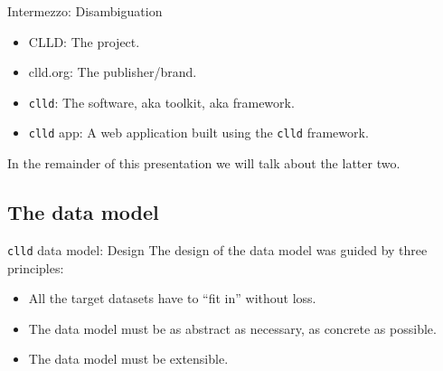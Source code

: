 \documentclass{beamer}
\begin{document}
\begin{frame}{Intermezzo: Disambiguation}
\begin{itemize}
\item {\color{darkred}CLLD}: The project.
\item {\color{darkred}clld.org}: The publisher/brand.
\item {\color{darkred}\texttt{clld}}: The software, aka toolkit, aka framework.
\item {\color{darkred}\texttt{clld} app}: A web application built using the \texttt{clld} framework.
\end{itemize}
In the remainder of this presentation we will talk about the latter two.
\end{frame}


\subsection{The data model}

\begin{frame}{\texttt{clld} data model: Design}
The design of the data model was guided by three principles:
\begin{itemize}
\item All the target datasets have to “fit in” without loss.
\item The data model must be as abstract as necessary, as concrete as possible.
\item The data model must be extensible.
\end{itemize}
\end{frame}
\end{document}
